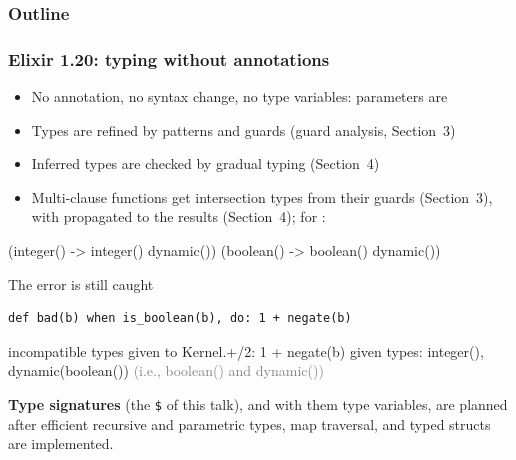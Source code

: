 
\begin{frame}
\frametitle{Outline}
\tableofcontents[currentsection]
\end{frame}

\begin{frame}[fragile]
\frametitle{Elixir 1.20: typing without annotations}\vspace{-4mm}
\begin{itemize}\setlength{\itemsep}{0pt}
\item No annotation, no syntax change, no type variables: parameters are 
\item Types are refined by patterns and guards (guard analysis, Section~3)
\item Inferred types are checked by gradual typing (Section~4)
\item Multi-clause functions get intersection types from their guards (Section~3),
      with  propagated to the results (Section~4); for :
\end{itemize}
\vspace{-1mm}
\begin{block}{\vspace{-5mm}}
\begin{coloredverbatim}
(integer() -> integer() \oand dynamic()) \oand
(boolean() -> boolean() \oand dynamic())
\end{coloredverbatim}
\vspace{-1mm}
\end{block}
\vspace{-2.5mm}
\begin{block}{The error is still caught}
\begin{verbatim}
def bad(b) when is_boolean(b), do: 1 + negate(b)
\end{verbatim}
\vspace{-1mm}
\begin{warnverbatim}
\warn incompatible types given to Kernel.+/2: 1 + negate(b)
given types: integer(), dynamic(boolean())   \textcolor{gray}{(i.e., boolean() and dynamic())}
\end{warnverbatim}
\vspace{-1mm}
\end{block}
\pause
{\small\textbf{\color{darkslateblue}Type signatures} (the \texttt{\$} of this talk), and with them type variables, are
planned after efficient recursive and parametric types, map traversal, and typed structs are implemented.\par}
\end{frame}

